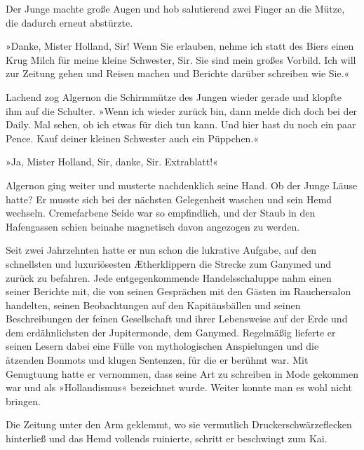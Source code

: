 Der Junge machte große Augen und hob salutierend zwei Finger an die
Mütze, die dadurch erneut abstürzte.

»Danke, Mister Holland, Sir! Wenn Sie erlauben, nehme ich statt des
Biers einen Krug Milch für meine kleine Schwester, Sir. Sie sind
mein großes Vorbild. Ich will zur Zeitung gehen und Reisen machen
und Berichte darüber schreiben wie Sie.«

Lachend zog Algernon die Schirmmütze des Jungen wieder gerade und
klopfte ihm auf die Schulter. »Wenn ich wieder zurück bin, dann
melde dich doch bei der Daily. Mal sehen, ob ich etwas für dich tun
kann. Und hier hast du noch ein paar Pence. Kauf deiner kleinen
Schwester auch ein Püppchen.«

»Ja, Mister Holland, Sir, danke, Sir. Extrablatt!«

\bigpar

Algernon ging weiter und musterte nachdenklich seine Hand. Ob der
Junge Läuse hatte? Er musste sich bei der nächsten Gelegenheit
waschen und sein Hemd wechseln. Cremefarbene Seide war so
empfindlich, und der Staub in den Hafengassen schien beinahe
magnetisch davon angezogen zu werden.

Seit zwei Jahrzehnten hatte er nun schon die lukrative Aufgabe, auf
den schnellsten und luxuriösesten Ætherklippern die Strecke zum
Ganymed und zurück zu befahren. Jede entgegenkommende
Handelsschaluppe nahm einen seiner Berichte mit, die von seinen
Gesprächen mit den Gästen im Rauchersalon handelten, seinen
Beobachtungen auf den Kapitänsbällen und seinen Beschreibungen der
feinen Gesellschaft und ihrer Lebensweise auf der Erde und dem
erdähnlichsten der Jupitermonde, dem Ganymed. Regelmäßig lieferte
er seinen Lesern dabei eine Fülle von mythologischen Anspielungen
und die ätzenden Bonmots und klugen Sentenzen, für die er berühmt
war. Mit Genugtuung hatte er vernommen, dass seine Art zu schreiben
in Mode gekommen war und als »Hollandismus« bezeichnet wurde.
Weiter konnte man es wohl nicht bringen.

\bigpar

Die Zeitung unter den Arm geklemmt, wo sie vermutlich
Druckerschwärzeflecken hinterließ und das Hemd vollends ruinierte,
schritt er beschwingt zum Kai.

\bigpar

